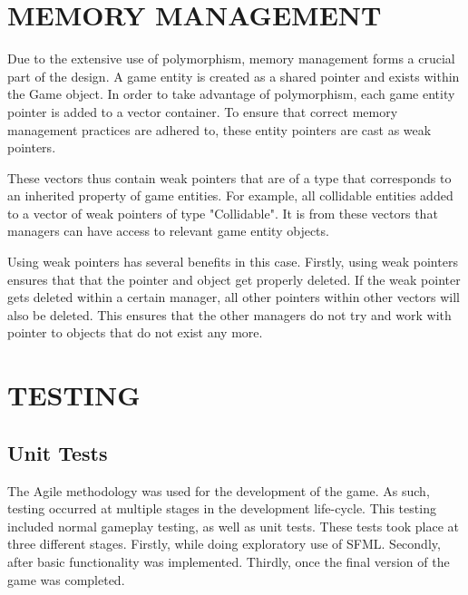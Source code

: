 \documentclass[10pt,twocolumn]{witseiepaper}
\begin{document}
%
\section{MEMORY MANAGEMENT}

Due to the extensive use of polymorphism, memory management forms a crucial part of the design. A game entity is created as a shared pointer and exists within the Game object. In order to take advantage of polymorphism, each game entity pointer is added to a vector container. To ensure that correct memory management practices are adhered to, these entity pointers are cast as weak pointers. 

These vectors thus contain weak pointers that are of a type that corresponds to an inherited property of game entities. For example, all collidable entities added to a vector of weak pointers of type "Collidable". It is from these vectors that managers can have access to relevant game entity objects.

Using weak pointers has several benefits in this case. Firstly, using weak pointers ensures that that the pointer and object get properly deleted. If the weak pointer gets deleted within a certain manager, all other pointers within other vectors will also be deleted. This ensures that the other managers do not try and work with pointer to objects that do not exist any more.




%
\section{TESTING} %

\subsection{Unit Tests}
The Agile methodology was used for the development of the game. As such, testing occurred at multiple stages in the development life-cycle. This testing included normal gameplay testing, as well as unit tests. These tests took place at three different stages. Firstly, while doing exploratory use of SFML. Secondly, after basic functionality was implemented. Thirdly, once the final version of the game was completed.
\end{document}
